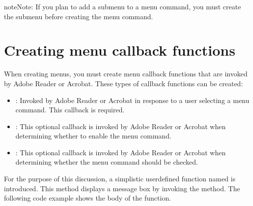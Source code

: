 \documentclass[letterpaper,12pt,english,openany,oneside]{sphinxmanual}
\begin{document}
\begin{sphinxVerbatim}[commandchars=\\\{\}]
          

  
      
      

   
\end{sphinxVerbatim}

\begin{sphinxadmonition}{note}{Note:}
If you plan to add a submenu to a menu command, you must create the submenu before creating the menu command.
\end{sphinxadmonition}


\section{Creating menu callback functions}
\label{\detokenize{Plugins_Menu:creating-menu-callback-functions}}
When creating menus, you must create menu callback functions that are invoked by Adobe Reader or Acrobat. These types of callback functions can be created:
\begin{itemize}
\item {} 
: Invoked by Adobe Reader or Acrobat in response to a user selecting a menu command. This callback is required.

\item {} 
: This optional callback is invoked by Adobe Reader or Acrobat when determining whether to enable the menu command.

\item {} 
: This optional callback is invoked by Adobe Reader or Acrobat when determining whether the menu command should be checked.

\end{itemize}

For the purpose of this discussion, a simplistic user\sphinxhyphen{}defined function named  is introduced. This method displays a message box by invoking the  method. The following code example shows the body of the  function.
\end{document}
